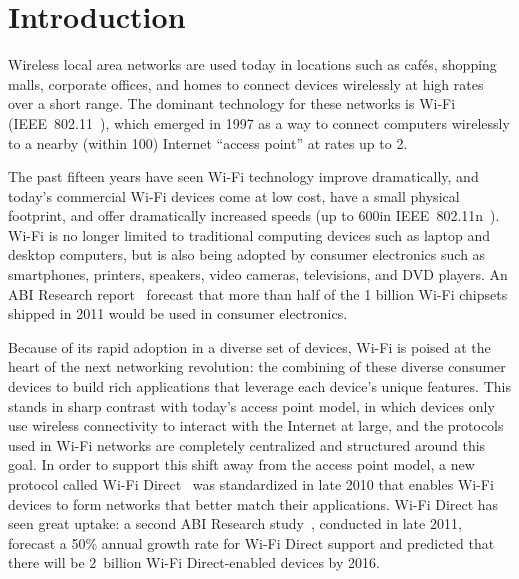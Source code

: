 \ifx\mainfile\undefined

\setcounter{chapter}{0} %
\fi

\cleardoublepage
\chapter{Introduction}
\label{chap:intro}


Wireless local area networks are used today in locations such as caf\'{e}s, shopping malls, corporate offices, and homes to connect devices wirelessly at high rates over a short range. The dominant technology for these networks is Wi-Fi (IEEE~802.11~\cite{80211}), which emerged in 1997 as a way to connect computers wirelessly to a nearby (within 100\m) Internet ``access point'' at rates up to 2\Mbps.

The past fifteen years have seen Wi-Fi technology improve dramatically, and today's commercial Wi-Fi devices come at low cost, have a small physical footprint, and offer dramatically increased speeds (up to 600\Mbps in IEEE~802.11n~\cite{80211n}). Wi-Fi is no longer limited to traditional computing devices such as laptop and desktop computers, but is also being adopted by consumer electronics such as smartphones, printers, speakers, video cameras, televisions, and DVD players. An ABI Research report~\cite{ABI_Research_2010} forecast that more than half of the 1 billion Wi-Fi chipsets shipped in 2011 would be used in consumer electronics.

Because of its rapid adoption in a diverse set of devices, Wi-Fi is poised at the heart of the next networking revolution: the combining of these diverse consumer devices to build rich applications that leverage each device's unique features. This stands in sharp contrast with today's access point model, in which devices only use wireless connectivity to interact with the Internet at large, and the protocols used in Wi-Fi networks are completely centralized and structured around this goal. In order to support this shift away from the access point model, a new protocol called Wi-Fi Direct~\cite{wifi_direct} was standardized in late 2010 that enables Wi-Fi devices to form networks that better match their applications. Wi-Fi Direct has seen great uptake: a second ABI Research study~\cite{ABI_Research_2011}, conducted in late 2011, forecast a 50\% annual growth rate for Wi-Fi Direct support and predicted that there will be 2~billion Wi-Fi Direct-enabled devices by 2016.

